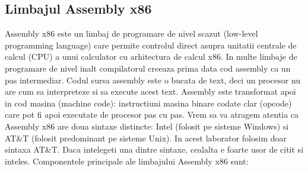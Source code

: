 \documentclass[a4paper,10pt]{article}
\begin{document}
\subsection{Limbajul Assembly x86}
Assembly x86 este un limbaj de programare de nivel scazut (low-level programming language)
care permite controlul direct asupra unitatii centrale de calcul (CPU) a unui calculator cu arhitectura
de calcul x86. In multe limbaje de programare de nivel inalt compilatorul creeaza prima data cod
assembly ca un pas intermediar. Codul sursa assembly este o bucata de text, deci un procesor nu are
cum sa interpreteze si sa execute acest text. Assembly este transformat apoi in cod masina (machine
code): instructiuni masina binare codate clar (opcode) care pot fi apoi executate de procesor pas
cu pas. Vrem sa va atragem atentia ca Assembly x86 are doua sintaxe distincte: Intel (folosit pe
sisteme Windows) si AT\&T (folosit predominant pe sisteme Unix). In acest laborator folosim doar sintaxa AT\&T. Daca intelegeti una dintre sintaxe, cealalta e foarte usor
de citit si inteles.
Componentele principale ale limbajului Assembly x86 sunt:
\end{document}
